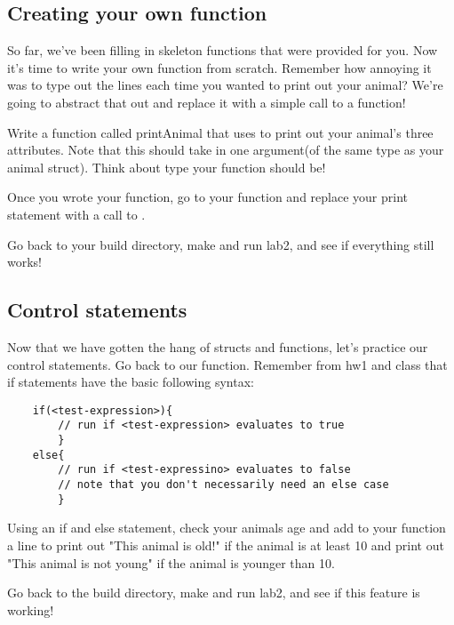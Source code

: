 \documentclass{tufte-handout}
\begin{document}
\subsection{Creating your own function}
So far, we've been filling in skeleton functions that were provided for you. Now it's time to write your own function from scratch.  Remember how annoying it was to type out the  lines each time you wanted to print out your animal?  We're going to abstract that out and replace it with a simple call to a function! 

Write a function called printAnimal that uses  to print out your animal's three attributes.  Note that this should take in one argument(of the same type as your animal struct).  Think about type your function should be!  

Once you wrote your function, go to your  function and replace your print statement with a call to .  

Go back to your build directory, make and run lab2, and see if everything still works!  

\subsection{Control statements}

Now that we have gotten the hang of structs and functions, let's practice our control statements.  Go back to our  function.  Remember from hw1 and class that if statements have the basic following syntax:
\begin{verbatim}
    if(<test-expression>){
        // run if <test-expression> evaluates to true
        }
    else{
        // run if <test-expressino> evaluates to false
        // note that you don't necessarily need an else case
        }
\end{verbatim}

Using an if and else statement, check your animals age and add to your  function a line to print out "This animal is old!" if the animal is at least 10 and print out "This animal is not young" if the animal is younger than 10.   

Go back to the build directory, make and run lab2, and see if this feature is working!  
\end{document}
